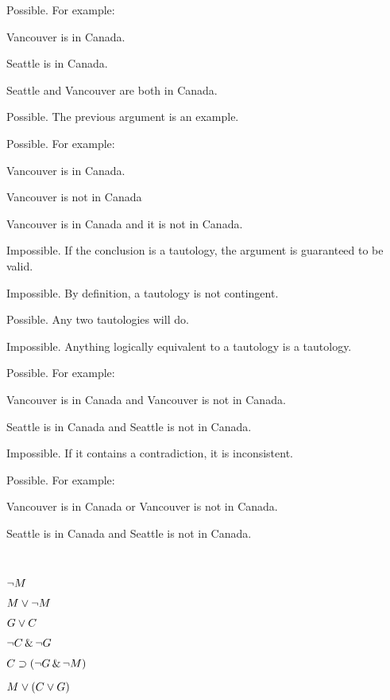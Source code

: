 \begin{earg}
\item Possible. For example:
	\begin {earg}
	\item[] Vancouver is in Canada.
	\item[] Seattle is in Canada.
	\item[\therefore] Seattle and Vancouver are both in Canada.
	\end{earg}
\item[2.] Possible. The previous argument is an example.
\item[3.] Possible. For example:
	\begin {earg}
	\item[] Vancouver is in Canada.
	\item[] Vancouver is not in Canada
	\item[\therefore] Vancouver is in Canada and it is not in Canada.
	\end{earg}
\item[4.] Impossible. If the conclusion is a tautology, the argument is guaranteed to be valid.
\item[5.] Impossible. By definition, a tautology is not contingent.
\item[6.] Possible. Any two tautologies will do.
\item[7.] Impossible. Anything logically equivalent to a tautology is a tautology.
\item[8.] Possible. For example:
	\begin {earg}
	\item[] Vancouver is in Canada and Vancouver is not in Canada.
	\item[] Seattle is in Canada and Seattle is not in Canada.
	\end{earg}
\item[9.] Impossible. If it contains a contradiction, it is inconsistent.
\item[10.] Possible. For example:
	\begin {earg}
	\item[] Vancouver is in Canada or Vancouver is not in Canada.
	\item[] Seattle is in Canada and Seattle is not in Canada.
	\end{earg}
\end{earg}\

\begin{earg}
\item $\neg M$
\item $M \vee \neg M$
\item $G \vee C$
\item $\neg C \,\&\, \neg G$
\item $C \supset (\neg G \,\&\, \neg M)$
\item $M \vee (C \vee G)$
\end{earg}

